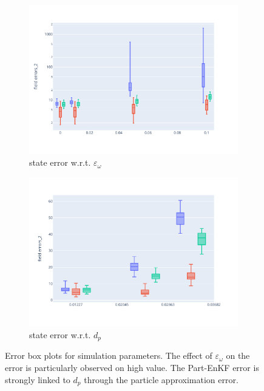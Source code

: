 \begin{figure}[htbp]
	\centering

	\begin{subfigure}{0.48\textwidth}
		\centering
		\includegraphics[width=\linewidth]{./images/app2d/MSE_eps_omega_box.pdf}
		\captionsetup{labelformat=empty}
		\caption{state error w.r.t. $\varepsilon_{\omega}$}
		\label{fig:eps_omega}
	\end{subfigure}
	\hfill
	\begin{subfigure}{0.48\textwidth}
		\centering
		\includegraphics[width=\linewidth]{./images/app2d/MSE_dp_box.pdf}
		\captionsetup{labelformat=empty}
		\caption{state error w.r.t. $d_p$}
		\label{fig:np_visc}
	\end{subfigure}

	\caption{Error box plots for simulation parameters. The effect of $\varepsilon_{\omega}$ on the error is particularly observed on high value. The Part-EnKF error is strongly linked to $d_p$ through the particle approximation error.}
	\label{fig:simu_parameters_error}
\end{figure}

